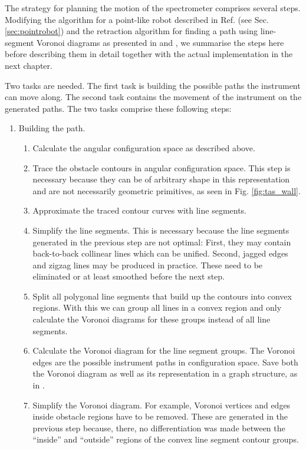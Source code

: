 The strategy for planning the motion of the spectrometer comprises several steps. Modifying the algorithm for
a point-like robot described in Ref. \cite[Ch. 13, pp. 283-306]{Berg2008} (see Sec. \ref{sec:pointrobot}) and the retraction
algorithm for finding a path using line-segment Voronoi diagrams as presented in \cite[p. 163]{Berg2008} and
\cite[pp. 247-251]{FUH_geo2020}, we summarise the steps here before describing them in detail together with the actual
implementation in the next chapter.

Two tasks are needed. The first task is building the possible paths the instrument can move along. The second task contains
the movement of the instrument on the generated paths. The two tasks comprise these following steps:
\begin{enumerate}
	\item Building the path.
	\begin{enumerate}
		\item Calculate the angular configuration space as described above.
		\item Trace the obstacle contours in angular configuration space. This step is necessary because they can be of arbitrary
			shape in this representation and are not necessarily geometric primitives, as seen in Fig. \ref{fig:tas_wall}.
		\item Approximate the traced contour curves with line segments.
		\item Simplify the line segments. This is necessary because the line segments generated in the previous step are not optimal:
			First, they may contain back-to-back collinear lines which can be unified. Second, jagged edges and zigzag lines may be
			produced in practice. These need to be eliminated or at least smoothed before the next step.
		\item Split all polygonal line segments that build up the contours into convex regions. With this we can group all lines
			in a convex region and only calculate the Voronoi diagrams for these groups instead of all line segments.
		\item Calculate the Voronoi diagram for the line segment groups. The Voronoi edges are the
			possible instrument paths in configuration space. Save both the Voronoi diagram as well as its representation 
			in a graph structure, as in \cite[p. 163]{Berg2008}.
		\item Simplify the Voronoi diagram. For example, Voronoi vertices and edges inside obstacle regions have to be removed.
			These are generated in the previous step because, there, no differentiation was made between the ``inside'' and
			``outside'' regions of the convex line segment contour groups.
	\end{enumerate}


\end{enumerate}

